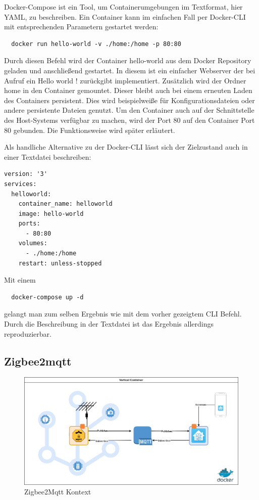 Docker-Compose ist ein Tool, um Containerumgebungen im Textformat, hier YAML, zu beschreiben.
Ein Container kann im einfachen Fall per Docker-CLI mit entsprechenden Parametern gestartet werden:
\begin{lstlisting}
  docker run hello-world -v ./home:/home -p 80:80
\end{lstlisting}

Durch diesen Befehl wird der Container \grqq hello-world\grqq{} aus dem Docker Repository geladen und anschließend gestartet. In diesem ist ein einfacher Webserver der bei
Aufruf ein \grqq Hello world !\grqq{} zurückgibt implementiert. Zusätzlich wird der Ordner \grqq home\grqq{} in den Container gemountet. Dieser bleibt auch bei einem
erneuten Laden des Containers persistent. Dies wird beispielweiße für Konfigurationsdateien oder andere persistente Dateien genutzt. Um den Container auch auf der Schnittstelle
des Host-Systems verfügbar zu machen, wird der Port 80 auf den Container Port 80 gebunden. Die Funktionsweise wird später erläutert.

Als handliche Alternative zu der Docker-CLI lässt sich der Zielzustand auch in einer Textdatei beschreiben:

\begin{lstlisting}
version: '3'
services:
  helloworld:
    container_name: helloworld
    image: hello-world
    ports:
      - 80:80
    volumes:
      - ./home:/home
    restart: unless-stopped
\end{lstlisting}

Mit einem 
\begin{lstlisting}
  docker-compose up -d
\end{lstlisting}

gelangt man zum selben Ergebnis wie mit dem vorher gezeigtem CLI Befehl. Durch die Beschreibung in der Textdatei ist das Ergebnis allerdings reproduzierbar.

\subsection{Zigbee2mqtt}

\begin{figure}[H]
  \centering
  \includegraphics[width=1\textwidth]{media/z2m-arch.png}
  \caption{Zigbee2Mqtt Kontext}
\end{figure}

